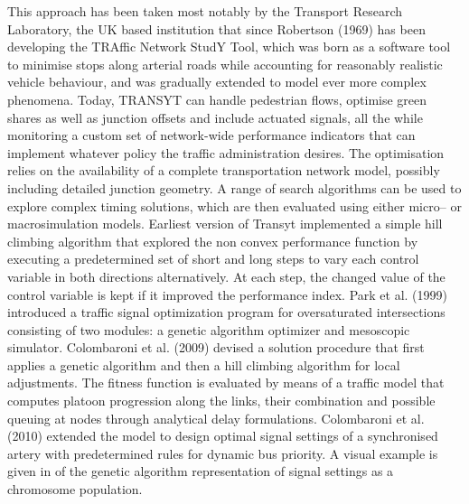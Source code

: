 This approach has been taken most notably by the Transport Research Laboratory, the UK based institution that since Robertson (1969) has been developing the TRAffic Network StudY Tool, which was born as a software tool to minimise stops along arterial roads while accounting for reasonably realistic vehicle behaviour, and was gradually extended to model ever more complex phenomena. Today, TRANSYT can handle pedestrian flows, optimise green shares as well as junction offsets and include actuated signals, all the while monitoring a custom set of network-wide performance indicators that can implement whatever policy the traffic administration desires. The optimisation relies on the availability of a complete transportation network model, possibly including detailed junction geometry. A range of search algorithms can be used to explore complex timing solutions, which are then evaluated using either micro– or macrosimulation models.
Earliest version of Transyt implemented a simple hill climbing algorithm that explored the non convex performance function by executing a predetermined set of short and long steps to vary each control variable in both directions alternatively. At each step, the changed value of the control variable is kept if it improved the performance index. Park et al. (1999) introduced a traffic signal optimization program for oversaturated intersections consisting of two modules: a genetic algorithm optimizer and mesoscopic simulator. Colombaroni et al. (2009) devised a solution procedure that first applies a genetic algorithm and then a hill climbing algorithm for local adjustments. The fitness function is evaluated by means of a traffic model that computes platoon progression along the links, their combination and possible queuing at nodes through analytical delay formulations. Colombaroni et al. (2010) extended the model to design optimal signal settings of a synchronised artery with predetermined rules for dynamic bus priority. A visual example is given in  of the genetic algorithm representation of signal settings as a chromosome population.

